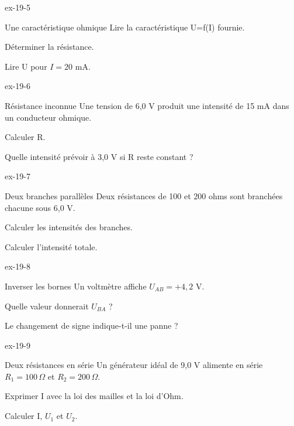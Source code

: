 \begin{blocLivre}{ex-19-5}\begin{exercice}[2]{Une caractéristique ohmique}
Lire la caractéristique U=f(I) fournie.
\begin{questions}
\item Déterminer la résistance.
\item Lire U pour $I=20$ mA.
\end{questions}
\end{exercice}\end{blocLivre}
\begin{blocLivre}{ex-19-6}\begin{exercice}[2]{Résistance inconnue}
Une tension de 6,0 V produit une intensité de 15 mA dans un conducteur ohmique.
\begin{questions}
\item Calculer R.
\item Quelle intensité prévoir à 3,0 V si R reste constant ?
\end{questions}
\end{exercice}\end{blocLivre}
\begin{blocLivre}{ex-19-7}\begin{exercice}[2]{Deux branches parallèles}
Deux résistances de 100 et 200 ohms sont branchées chacune sous 6,0 V.
\begin{questions}
\item Calculer les intensités des branches.
\item Calculer l’intensité totale.
\end{questions}
\end{exercice}\end{blocLivre}
\begin{blocLivre}{ex-19-8}\begin{exercice}[2]{Inverser les bornes}
Un voltmètre affiche $U_{AB}=+4,2$ V.
\begin{questions}
\item Quelle valeur donnerait $U_{BA}$ ?
\item Le changement de signe indique-t-il une panne ?
\end{questions}
\end{exercice}\end{blocLivre}
\begin{blocLivre}{ex-19-9}\begin{exercice}[3]{Deux résistances en série}
Un générateur idéal de 9,0 V alimente en série $R_1=100\,\Omega$ et $R_2=200\,\Omega$.
\begin{questions}
\item Exprimer I avec la loi des mailles et la loi d’Ohm.
\item Calculer I, $U_1$ et $U_2$.
\end{questions}
\end{exercice}\end{blocLivre}
